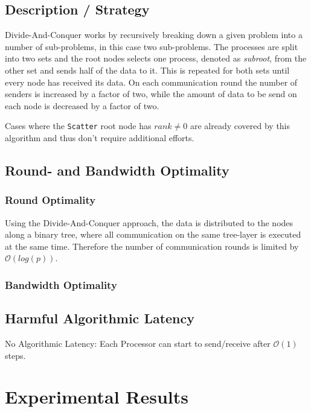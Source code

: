 \subsection{Description / Strategy}

Divide-And-Conquer works by recursively breaking down a given problem into a number of sub-problems, in this case two sub-problems. The processes are split into two sets and the root nodes selects one process, denoted as \textit{subroot}, from the other set and sends half of the data to it. This is repeated for both sets until every node has received its data. On each communication round the number of senders is increased by a factor of two, while the amount of data to be send on each node is decreased by a factor of two.\newline

\noindent Cases where the \texttt{Scatter} root node has $rank \neq 0$ are already covered by this algorithm and thus don't require additional efforts. 

\subsection{Round- and Bandwidth Optimality}

\subsubsection{Round Optimality}

Using the Divide-And-Conquer approach, the data is distributed to the nodes along a binary tree, where all communication on the same tree-layer is executed at the same time. Therefore the number of communication rounds is limited by $\mathcal{O}(log(p))$.

\subsubsection{Bandwidth Optimality}



\subsection{Harmful Algorithmic Latency}

No Algorithmic Latency: Each Processor can start to send/receive after $\mathcal{O}(1)$ steps.

\section{Experimental Results}

